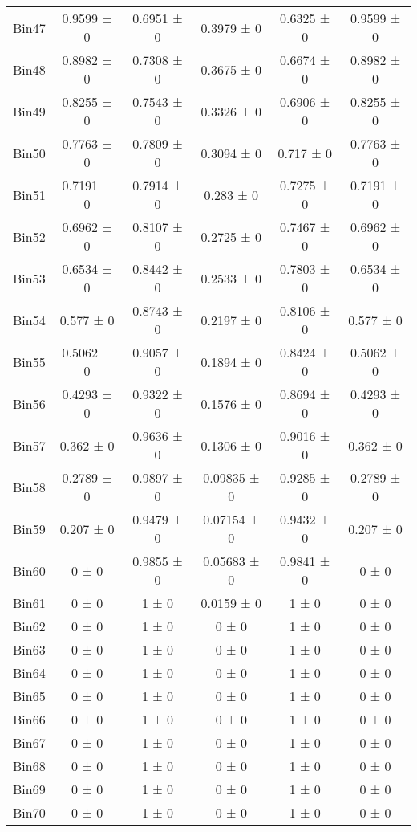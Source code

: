 \begin{tabular}{@{\extracolsep{4pt}}lccccc@{}}
     Bin47 & 0.9599 ± 0 & 0.6951 ± 0 & 0.3979 ± 0 & 0.6325 ± 0 & 0.9599 ± 0 \\ 
     Bin48 & 0.8982 ± 0 & 0.7308 ± 0 & 0.3675 ± 0 & 0.6674 ± 0 & 0.8982 ± 0 \\ 
     Bin49 & 0.8255 ± 0 & 0.7543 ± 0 & 0.3326 ± 0 & 0.6906 ± 0 & 0.8255 ± 0 \\ 
     Bin50 & 0.7763 ± 0 & 0.7809 ± 0 & 0.3094 ± 0 & 0.717 ± 0 & 0.7763 ± 0 \\ 
     Bin51 & 0.7191 ± 0 & 0.7914 ± 0 & 0.283 ± 0 & 0.7275 ± 0 & 0.7191 ± 0 \\ 
     Bin52 & 0.6962 ± 0 & 0.8107 ± 0 & 0.2725 ± 0 & 0.7467 ± 0 & 0.6962 ± 0 \\ 
     Bin53 & 0.6534 ± 0 & 0.8442 ± 0 & 0.2533 ± 0 & 0.7803 ± 0 & 0.6534 ± 0 \\ 
     Bin54 & 0.577 ± 0 & 0.8743 ± 0 & 0.2197 ± 0 & 0.8106 ± 0 & 0.577 ± 0 \\ 
     Bin55 & 0.5062 ± 0 & 0.9057 ± 0 & 0.1894 ± 0 & 0.8424 ± 0 & 0.5062 ± 0 \\ 
     Bin56 & 0.4293 ± 0 & 0.9322 ± 0 & 0.1576 ± 0 & 0.8694 ± 0 & 0.4293 ± 0 \\ 
     Bin57 & 0.362 ± 0 & 0.9636 ± 0 & 0.1306 ± 0 & 0.9016 ± 0 & 0.362 ± 0 \\ 
     Bin58 & 0.2789 ± 0 & 0.9897 ± 0 & 0.09835 ± 0 & 0.9285 ± 0 & 0.2789 ± 0 \\ 
     Bin59 & 0.207 ± 0 & 0.9479 ± 0 & 0.07154 ± 0 & 0.9432 ± 0 & 0.207 ± 0 \\ 
     Bin60 & 0 ± 0 & 0.9855 ± 0 & 0.05683 ± 0 & 0.9841 ± 0 & 0 ± 0 \\ 
     Bin61 & 0 ± 0 & 1 ± 0 & 0.0159 ± 0 & 1 ± 0 & 0 ± 0 \\ 
     Bin62 & 0 ± 0 & 1 ± 0 & 0 ± 0 & 1 ± 0 & 0 ± 0 \\ 
     Bin63 & 0 ± 0 & 1 ± 0 & 0 ± 0 & 1 ± 0 & 0 ± 0 \\ 
     Bin64 & 0 ± 0 & 1 ± 0 & 0 ± 0 & 1 ± 0 & 0 ± 0 \\ 
     Bin65 & 0 ± 0 & 1 ± 0 & 0 ± 0 & 1 ± 0 & 0 ± 0 \\ 
     Bin66 & 0 ± 0 & 1 ± 0 & 0 ± 0 & 1 ± 0 & 0 ± 0 \\ 
     Bin67 & 0 ± 0 & 1 ± 0 & 0 ± 0 & 1 ± 0 & 0 ± 0 \\ 
     Bin68 & 0 ± 0 & 1 ± 0 & 0 ± 0 & 1 ± 0 & 0 ± 0 \\ 
     Bin69 & 0 ± 0 & 1 ± 0 & 0 ± 0 & 1 ± 0 & 0 ± 0 \\ 
     Bin70 & 0 ± 0 & 1 ± 0 & 0 ± 0 & 1 ± 0 & 0 ± 0 \\ 

\end{tabular}
